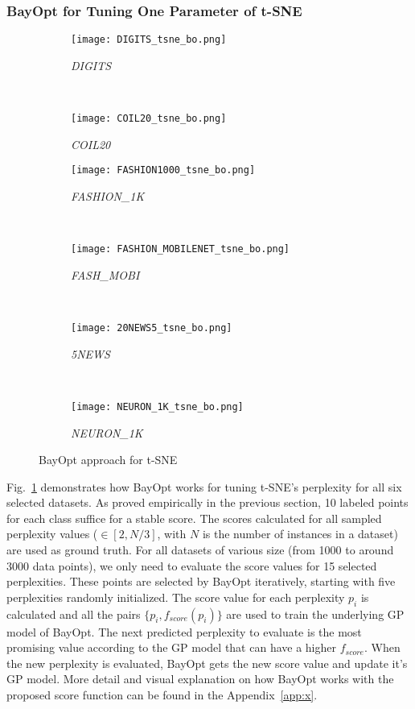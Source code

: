 \subsubsection{BayOpt for Tuning One Parameter of t-SNE}\label{sec:result:bo:tsne}

\begin{figure}%
    \begin{subfigure}[b]{.46\linewidth}
        \centering
        \texttt{[image: DIGITS\_tsne\_bo.png]}
        \caption{\emph{DIGITS}}
    \end{subfigure}
    ~
    \begin{subfigure}[b]{.46\linewidth}
        \centering
        \texttt{[image: COIL20\_tsne\_bo.png]}
        \caption{\emph{COIL20}}
    \end{subfigure}
    \vfill
    \begin{subfigure}[b]{.46\linewidth}
        \centering
        \texttt{[image: FASHION1000\_tsne\_bo.png]}
        \caption{\emph{FASHION\_1K}}
    \end{subfigure}
    ~
    \begin{subfigure}[b]{.46\linewidth}
        \centering
        \texttt{[image: FASHION\_MOBILENET\_tsne\_bo.png]}
        \caption{\emph{FASH\_MOBI}}
    \end{subfigure}
    ~
    \vfill
    \begin{subfigure}[b]{.46\linewidth}
        \centering
        \texttt{[image: 20NEWS5\_tsne\_bo.png]}
        \caption{\emph{5NEWS}}
    \end{subfigure}
    ~
    \begin{subfigure}[b]{.46\linewidth}
        \centering
        \texttt{[image: NEURON\_1K\_tsne\_bo.png]}
        \caption{\emph{NEURON\_1K}}
    \end{subfigure}
    \caption{BayOpt approach for  t-SNE}
    \label{fig:tsne:bo:all}
\end{figure}

Fig.~\ref{fig:tsne:bo:all} demonstrates how BayOpt works for tuning t-SNE's perplexity for all six selected datasets.
As proved empirically in the previous section, 10 labeled points for each class suffice for a stable score.
The scores calculated for all sampled perplexity values ($\in [2, N/3]$, with $N$ is the number of instances in a dataset) are used as ground truth.
For all datasets of various size (from 1000 to around 3000 data points), we only need to evaluate the score values for 15 selected perplexities.
These points are selected by BayOpt iteratively, starting with five perplexities randomly initialized.
The score value for each perplexity $p_i$ is calculated and all the pairs $\{p_i, f_{score}(p_i)\}$ are used to train the underlying GP model of BayOpt.
The next predicted perplexity to evaluate is the most promising value according to the GP model that can have a higher $f_{score}$.
When the new perplexity is evaluated, BayOpt gets the new score value and update it's GP model.
More detail and visual explanation on how BayOpt works with the proposed score function can be found in the Appendix~\ref{app:x}.

